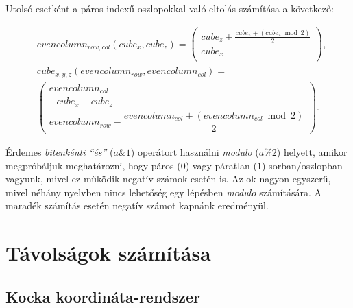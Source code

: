 %

Utolsó esetként a páros indexű oszlopokkal való eltolás számítása a következő:

\begin{align*}
&evencolumn_{row, col}(cube_{x}, cube_{z}) =
\left(
\begin{array}{c}
cube_{z} + \frac{cube_{x} + (cube_{x} \bmod 2)}{2} \\
cube_{x} \\
\end{array}
\right),
\\
&cube_{x,y,z}(evencolumn_{row}, evencolumn_{col}) = \\
&\left(
\begin{array}{c}
evencolumn_{col} \\
-cube_{x} - cube_{z} \\
evencolumn_{row} - \dfrac{evencolumn_{col} + (evencolumn_{col} \bmod 2)}{2}
\end{array}
\right).
\end{align*}

%

\noindent Érdemes \textit{bitenkénti “és”} ($a \& 1$) operátort használni \textit{modulo} ($a \% 2$) helyett, amikor megpróbáljuk meghatározni, hogy páros ($0$) vagy páratlan ($1$) sorban/oszlopban vagyunk, mivel ez működik negatív számok esetén is. Az ok nagyon egyszerű, mivel néhány nyelvben nincs lehetőség egy lépésben \textit{modulo} számítására. A maradék számítás esetén negatív számot kapnánk eredményül. 

\section{Távolságok számítása}

\subsection{Kocka koordináta-rendszer}

